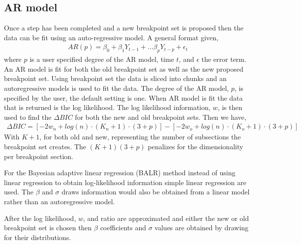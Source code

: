 \documentclass[submit]{smj}
\begin{document}
\subsection{AR model}
Once a step has been completed and a new breakpoint set is proposed then the data can be fit using an auto-regressive model. A general format given,
\begin{align*}
AR(p) = \beta_0 + \beta_1 Y_{t-1} + \dots \beta_{p} Y_{t- p} + \epsilon_t
\end{align*}
where $p$ is a user specified degree of the AR model, time $t$, and $\epsilon$ the error term. 
An AR model is fit for both the old breakpoint set as well as the new proposed breakpoint set. Using breakpoint set the data is sliced into chunks and an autoregressive models is used to fit the data. The degree of the AR model, $p$, is specified by the user, the default setting is one. When AR model is fit the data that is returned is the log likelihood. The log likelihood information, $w$, is then used to find the $\Delta BIC$ for both the new and old breakpoint sets. Then we have,
\begin{align*}
\Delta BIC = [-2 w_n + log(n) \cdot (K_n +1) \cdot (3 + p)] -[-2 w_o+ log(n) \cdot (K_o +1 ) \cdot ( 3 + p)] 
\end{align*}
With $K+1$, for both old and new, representing the number of subsections the breakpoint set creates. The $(K+1)(3 +p)$ penalizes for the dimensionality per breakpoint section.

For the Bayesian adaptive linear regression (BALR) method instead of using linear regression to obtain log-likelihood information simple linear regression are used. The $\beta$ and $\sigma$ draws information would also be obtained from a linear model rather than an autoregressive model. 

After the log likelihood, $w$, and ratio are approximated and either the new or old breakpoint set is chosen then $\beta$ coefficients and $\sigma$ values are obtained by drawing for their distributions.
\end{document}
